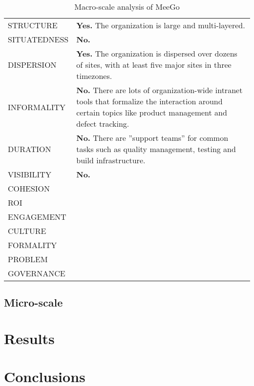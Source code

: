 \documentclass[
a4paper,
11pt,
parskip,
\MYLANGUAGE,
abstractoff,
bibliography=totoc
]{scrartcl}
\begin{document}
\begin{table}[htbp]
\begin{center}
\begin{tabular}{lp{100mm}}
STRUCTURE & {\bf Yes.} The organization is large and multi-layered.\\
SITUATEDNESS & {\bf No.}\\
DISPERSION & {\bf Yes.} The organization is dispersed over dozens of sites, with at least five major sites in three timezones.\\
INFORMALITY & {\bf No.} There are lots of organization-wide intranet tools that formalize the interaction around certain topics like product management and defect tracking.\\
DURATION & {\bf No.} There are ''support teams'' for common tasks such as quality management, testing and build infrastructure.\\
VISIBILITY & {\bf No.}\\
COHESION & ~ \\
ROI & ~ \\
ENGAGEMENT & ~ \\
CULTURE & ~ \\
FORMALITY & ~ \\
PROBLEM & ~ \\
GOVERNANCE & ~ \\
\end{tabular}
\vspace{1em}
\caption{Macro-scale analysis of MeeGo}
\label{tab:macro1}
\end{center}
\end{table}






\subsection{Micro-scale}


\section{Results}


\section{Conclusions}





\end{document}
